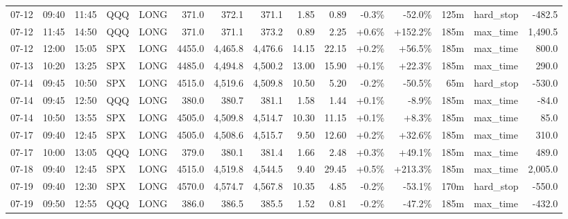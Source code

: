 \documentclass[11pt,a4paper,twoside]{article}
\begin{document}
\begin{landscape}
\begin{center}
\begin{longtable}{>{\color{txtmain}}l l l l l r r r r r r r r >{\color{txtmain}}l r}
07-12 & 09:40 & 11:45 & QQQ & LONG & 371.0 & 372.1 & 371.1 & 1.85 & 0.89 & \textcolor{lossred}{-0.3\%} & \textcolor{lossred}{-52.0\%} & 125m & hard\_stop & \textcolor{lossred}{-482.5} \\
07-12 & 11:45 & 14:50 & QQQ & LONG & 371.0 & 371.1 & 373.2 & 0.89 & 2.25 & \textcolor{wingreen}{+0.6\%} & \textcolor{wingreen}{+152.2\%} & 185m & max\_time & \textcolor{wingreen}{1,490.5} \\
07-12 & 12:00 & 15:05 & SPX & LONG & 4455.0 & 4,465.8 & 4,476.6 & 14.15 & 22.15 & \textcolor{wingreen}{+0.2\%} & \textcolor{wingreen}{+56.5\%} & 185m & max\_time & \textcolor{wingreen}{800.0} \\
07-13 & 10:20 & 13:25 & SPX & LONG & 4485.0 & 4,494.8 & 4,500.2 & 13.00 & 15.90 & \textcolor{wingreen}{+0.1\%} & \textcolor{wingreen}{+22.3\%} & 185m & max\_time & \textcolor{wingreen}{290.0} \\
07-14 & 09:45 & 10:50 & SPX & LONG & 4515.0 & 4,519.6 & 4,509.8 & 10.50 & 5.20 & \textcolor{lossred}{-0.2\%} & \textcolor{lossred}{-50.5\%} & 65m & hard\_stop & \textcolor{lossred}{-530.0} \\
07-14 & 09:45 & 12:50 & QQQ & LONG & 380.0 & 380.7 & 381.1 & 1.58 & 1.44 & \textcolor{wingreen}{+0.1\%} & \textcolor{lossred}{-8.9\%} & 185m & max\_time & \textcolor{lossred}{-84.0} \\
07-14 & 10:50 & 13:55 & SPX & LONG & 4505.0 & 4,509.8 & 4,514.7 & 10.30 & 11.15 & \textcolor{wingreen}{+0.1\%} & \textcolor{wingreen}{+8.3\%} & 185m & max\_time & \textcolor{wingreen}{85.0} \\
07-17 & 09:40 & 12:45 & SPX & LONG & 4505.0 & 4,508.6 & 4,515.7 & 9.50 & 12.60 & \textcolor{wingreen}{+0.2\%} & \textcolor{wingreen}{+32.6\%} & 185m & max\_time & \textcolor{wingreen}{310.0} \\
07-17 & 10:00 & 13:05 & QQQ & LONG & 379.0 & 380.1 & 381.4 & 1.66 & 2.48 & \textcolor{wingreen}{+0.3\%} & \textcolor{wingreen}{+49.1\%} & 185m & max\_time & \textcolor{wingreen}{489.0} \\
07-18 & 09:40 & 12:45 & SPX & LONG & 4515.0 & 4,519.8 & 4,544.5 & 9.40 & 29.45 & \textcolor{wingreen}{+0.5\%} & \textcolor{wingreen}{+213.3\%} & 185m & max\_time & \textcolor{wingreen}{2,005.0} \\
07-19 & 09:40 & 12:30 & SPX & LONG & 4570.0 & 4,574.7 & 4,567.8 & 10.35 & 4.85 & \textcolor{lossred}{-0.2\%} & \textcolor{lossred}{-53.1\%} & 170m & hard\_stop & \textcolor{lossred}{-550.0} \\
07-19 & 09:50 & 12:55 & QQQ & LONG & 386.0 & 386.5 & 385.5 & 1.52 & 0.81 & \textcolor{lossred}{-0.2\%} & \textcolor{lossred}{-47.2\%} & 185m & max\_time & \textcolor{lossred}{-432.0} \\

\end{longtable}
\end{center}
\end{landscape}
\end{document}
